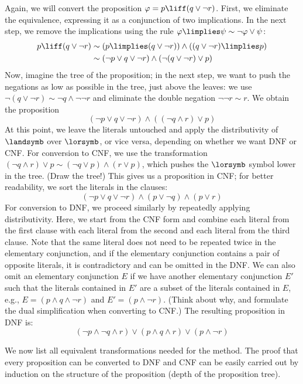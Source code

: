 \begin{example}
    Again, we will convert the proposition $\varphi = p \liff (q \lor \neg r)$. First, we eliminate the equivalence, expressing it as a conjunction of two implications. In the next step, we remove the implications using the rule $\varphi \limplies \psi \sim \neg \varphi \lor \psi$:
    \begin{align*}
        p \liff (q \lor \neg r) &\sim (p \limplies (q \lor \neg r)) \land ((q \lor \neg r) \limplies p)\\
        &\sim (\neg p \lor q \lor \neg r) \land (\neg (q \lor \neg r) \lor p)
    \end{align*}
    Now, imagine the tree of the proposition; in the next step, we want to push the negations as low as possible in the tree, just above the leaves: we use $\neg (q \lor \neg r) \sim \neg q \land \neg \neg r$ and eliminate the double negation $\neg \neg r \sim r$. We obtain the proposition
    $$
    (\neg p \lor q \lor \neg r) \land ( (\neg q \land r) \lor p)
    $$
    At this point, we leave the literals untouched and apply the distributivity of $\landsymb$ over $\lorsymb$, or vice versa, depending on whether we want DNF or CNF. For conversion to CNF, we use the transformation $(\neg q \land r) \lor p \sim (\neg q \lor p) \land (r \lor p)$, which pushes the $\lorsymb$ symbol lower in the tree. (Draw the tree!) This gives us a proposition in CNF; for better readability, we sort the literals in the clauses:
    $$
    (\neg p \lor q \lor \neg r) \land (p \lor \neg q) \land (p \lor r)
    $$
    For conversion to DNF, we proceed similarly by repeatedly applying distributivity. Here, we start from the CNF form and combine each literal from the first clause with each literal from the second and each literal from the third clause. Note that the same literal does not need to be repeated twice in the elementary conjunction, and if the elementary conjunction contains a pair of opposite literals, it is contradictory and can be omitted in the DNF. We can also omit an elementary conjunction $E$ if we have another elementary conjunction $E'$ such that  the literals contained in $E'$ are a subset of the literals contained in $E$, e.g., $E = (p \land q \land \neg r)$ and $E' = (p \land \neg r)$. (Think about why, and formulate the dual simplification when converting to CNF.) The resulting proposition in DNF is:
    $$
    (\neg p \land \neg q \land r) \lor (p \land q \land r) \lor (p \land \neg r)
    $$
\end{example}

We now list all equivalent transformations needed for the method. The proof that every proposition can be converted to DNF and CNF can be easily carried out by induction on the structure of the proposition (depth of the proposition tree).

